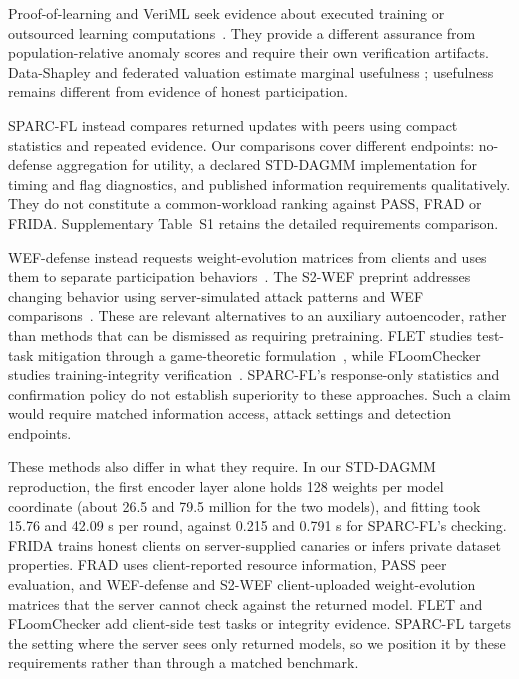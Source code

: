 \documentclass[journal]{IEEEtran}
\begin{document}
Proof-of-learning and VeriML seek evidence about executed training or
outsourced learning computations~\cite{jia2021prooflearning,zhao2021veriml}.
They provide a different assurance from population-relative anomaly
scores and require their own verification artifacts. Data-Shapley and
federated valuation estimate marginal usefulness
\cite{ghorbani2019datashapley,jia2019datavaluation,liu2022gtgshapley};
usefulness remains different from evidence of honest participation.

SPARC-FL instead compares returned updates with peers using compact
statistics and repeated evidence. Our comparisons cover different
endpoints: no-defense aggregation for utility, a declared STD-DAGMM
implementation for timing and flag diagnostics, and published information
requirements qualitatively. They do not constitute a common-workload
ranking against PASS, FRAD or FRIDA. Supplementary Table~S1 retains the
detailed requirements comparison.

WEF-defense instead requests weight-evolution matrices from clients and
uses them to separate participation behaviors~\cite{chen2022wef}.
The S2-WEF preprint addresses changing behavior using server-simulated
attack patterns and WEF comparisons~\cite{nakamura2026s2wef}. These are
relevant alternatives to an auxiliary autoencoder, rather than methods
that can be dismissed as requiring pretraining. FLET studies test-task
mitigation through a game-theoretic formulation~\cite{guo2026flet}, while
FLoomChecker studies training-integrity verification~\cite{liang2024floom}.
SPARC-FL's response-only statistics and confirmation policy do not establish
superiority to these approaches. Such a claim would require matched
information access, attack settings and detection endpoints.

These methods also differ in what they require. In our STD-DAGMM
reproduction, the first encoder layer alone holds 128 weights per model
coordinate (about 26.5 and 79.5 million for the two models), and fitting
took 15.76 and 42.09 s per round, against
0.215 and 0.791 s for SPARC-FL's checking. FRIDA trains honest clients on
server-supplied canaries or infers private dataset properties. FRAD uses
client-reported resource information, PASS peer evaluation, and
WEF-defense and S2-WEF client-uploaded weight-evolution matrices that the
server cannot check against the returned model. FLET and FLoomChecker add
client-side test tasks or integrity evidence. SPARC-FL targets the setting
where the server sees only returned models, so we position it by these
requirements rather than through a matched benchmark.
\end{document}
